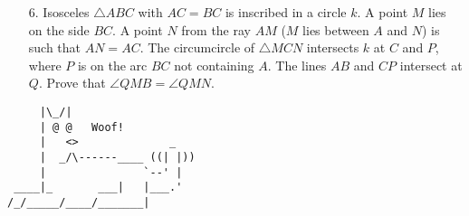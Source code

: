 \documentclass[a4paper, 12pt]{article}
\begin{document}
\begin{enumerate}
\item[6.]
Isosceles $\triangle ABC$ with $AC=BC$ is inscribed in a circle $k$. A point $M$ lies on the side $BC$. A point $N$ from the ray $AM$ ($M$ lies between $A$ and $N$) is such that $AN=AC$. The circumcircle of $\triangle MCN$ intersects $k$ at $C$ and $P$, where $P$ is on the arc $BC$ not containing $A$. The lines $AB$ and $CP$ intersect at $Q$. Prove that $\angle QMB = \angle QMN$.


\end{enumerate}

\vfill

\centering
\begin{BVerbatim}
     |\_/|                  
     | @ @   Woof! 
     |   <>              _  
     |  _/\------____ ((| |))
     |               `--' |   
 ____|_       ___|   |___.' 
/_/_____/____/_______|
\end{BVerbatim}

\vspace{12mm}
\end{document}
